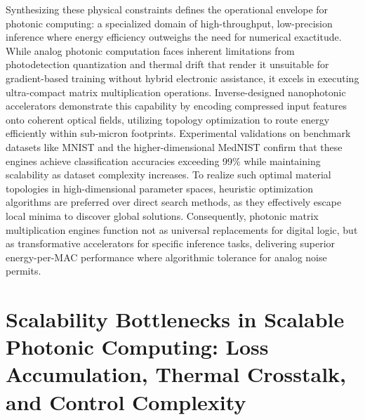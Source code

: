 Synthesizing these physical constraints defines the operational envelope for photonic computing: a specialized domain of high-throughput, low-precision inference where energy efficiency outweighs the need for numerical exactitude. While analog photonic computation faces inherent limitations from photodetection quantization and thermal drift that render it unsuitable for gradient-based training without hybrid electronic assistance, it excels in executing ultra-compact matrix multiplication operations. Inverse-designed nanophotonic accelerators demonstrate this capability by encoding compressed input features onto coherent optical fields, utilizing topology optimization to route energy efficiently within sub-micron footprints. Experimental validations on benchmark datasets like MNIST and the higher-dimensional MedNIST confirm that these engines achieve classification accuracies exceeding 99\% while maintaining scalability as dataset complexity increases. To realize such optimal material topologies in high-dimensional parameter spaces, heuristic optimization algorithms are preferred over direct search methods, as they effectively escape local minima to discover global solutions. Consequently, photonic matrix multiplication engines function not as universal replacements for digital logic, but as transformative accelerators for specific inference tasks, delivering superior energy-per-MAC performance where algorithmic tolerance for analog noise permits. \citep{doi_10_1038_s41467_026_68648_1_26658a9c} \citep{s2_cea9e6112f363e19aa754d2681622ab07650c71c_7db5c737} \citep{doi_10_3390_nano14080697_c372a140} \citep{doi_10_1515_nanoph_2022_0423_38a2c3ec}

\section{Scalability Bottlenecks in Scalable Photonic Computing: Loss Accumulation, Thermal Crosstalk, and Control Complexity}\label{scalability-bottlenecks-in-scalable-photonic-computing-loss-accumulation-thermal-crosstalk-and-control-complexity}


